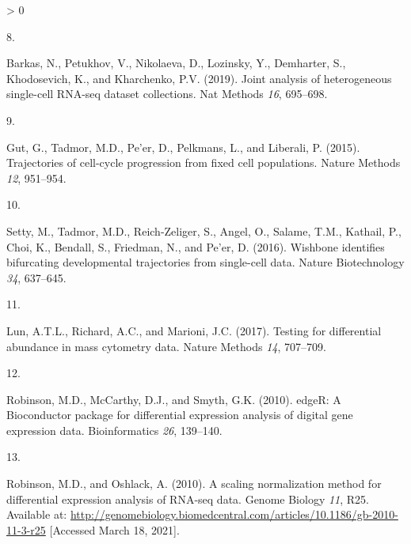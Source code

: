 \documentclass[
]{article}
\newlength{\cslhangindent}
\newlength{\csllabelwidth}
\newenvironment{CSLReferences}[2] %
 {%
  \setlength{\parindent}{0pt}
  \ifodd #1 \everypar{\setlength{\hangindent}{\cslhangindent}}\ignorespaces\fi
  \ifnum #2 > 0
  \setlength{\parskip}{#2\baselineskip}
  \fi
 }%
 {}
\newcommand{\CSLLeftMargin}[1]{\parbox[t]{\csllabelwidth}{#1}}
\newcommand{\CSLRightInline}[1]{\parbox[t]{\linewidth - \csllabelwidth}{#1}\break}
\begin{document}
\begin{CSLReferences}{0}{0}
\leavevmode\hypertarget{ref-barkasJointAnalysisHeterogeneous2019}{}%
\CSLLeftMargin{8. }
\CSLRightInline{Barkas, N., Petukhov, V., Nikolaeva, D., Lozinsky, Y., Demharter, S., Khodosevich, K., and Kharchenko, P.V. (2019). Joint analysis of heterogeneous single-cell {RNA}-seq dataset collections. Nat Methods \emph{16}, 695--698.}

\leavevmode\hypertarget{ref-gutTrajectoriesCellcycleProgression2015}{}%
\CSLLeftMargin{9. }
\CSLRightInline{Gut, G., Tadmor, M.D., Pe'er, D., Pelkmans, L., and Liberali, P. (2015). Trajectories of cell-cycle progression from fixed cell populations. Nature Methods \emph{12}, 951--954.}

\leavevmode\hypertarget{ref-settyWishboneIdentifiesBifurcating2016}{}%
\CSLLeftMargin{10. }
\CSLRightInline{Setty, M., Tadmor, M.D., Reich-Zeliger, S., Angel, O., Salame, T.M., Kathail, P., Choi, K., Bendall, S., Friedman, N., and Pe'er, D. (2016). Wishbone identifies bifurcating developmental trajectories from single-cell data. Nature Biotechnology \emph{34}, 637--645.}

\leavevmode\hypertarget{ref-lunTestingDifferentialAbundance2017}{}%
\CSLLeftMargin{11. }
\CSLRightInline{Lun, A.T.L., Richard, A.C., and Marioni, J.C. (2017). Testing for differential abundance in mass cytometry data. Nature Methods \emph{14}, 707--709.}

\leavevmode\hypertarget{ref-robinsonEdgeRBioconductorPackage2010a}{}%
\CSLLeftMargin{12. }
\CSLRightInline{Robinson, M.D., McCarthy, D.J., and Smyth, G.K. (2010). {edgeR}: A {Bioconductor} package for differential expression analysis of digital gene expression data. Bioinformatics \emph{26}, 139--140.}

\leavevmode\hypertarget{ref-robinsonTMM2010}{}%
\CSLLeftMargin{13. }
\CSLRightInline{Robinson, M.D., and Oshlack, A. (2010). A scaling normalization method for differential expression analysis of {RNA}-seq data. Genome Biology \emph{11}, R25. Available at: \url{http://genomebiology.biomedcentral.com/articles/10.1186/gb-2010-11-3-r25} {[}Accessed March 18, 2021{]}.}

\end{CSLReferences}
\end{document}
